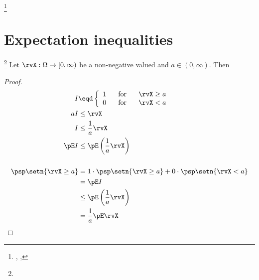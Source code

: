 \begin{theorem}
\footnote{
  ,
  ,
  }
\end{theorem}


\section{Expectation inequalities}
\begin{theorem}
\footnote{
  }
\label{thm:markovineq}
Let $\rvX:\Omega\to[0,\infty)$ be a non-negative valued  and
$a\in(0,\infty)$. Then
\end{theorem}
\begin{proof}
\begin{align*}
  I &\eqd \left\{ \begin{array}{l@{\hspace{4ex}\mbox{for}\hspace{4ex}}l}
    1 &\rvX\ge a \\
    0 &\rvX < a
    \end{array}\right.
\\
  aI &\le\rvX           \\
   I &\le \frac{1}{a}\rvX \\
   \pE I &\le \pE\left(\frac{1}{a}\rvX\right) \\
\\
   \psp\setn{\rvX\ge a}
     &= 1\cdot\psp\setn{\rvX\ge a} + 0\cdot\psp\setn{\rvX<a}
   \\&= \pE I
   \\&\le \pE\left(\frac{1}{a}\rvX \right)
   \\&=   \frac{1}{a}\pE\rvX
\end{align*}
\end{proof}


